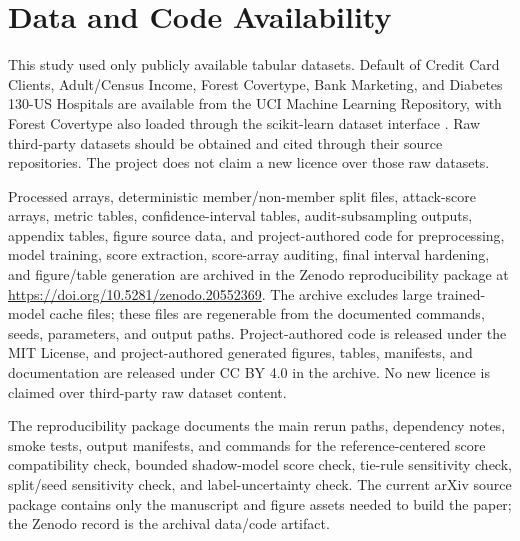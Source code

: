 \documentclass[
  10pt,
  twocolumn]{article}
\begin{document}
\hypertarget{data-and-code-availability}{%
\section{Data and Code Availability}\label{data-and-code-availability}}

This study used only publicly available tabular datasets. Default of Credit Card Clients, Adult/Census Income, Forest Covertype, Bank Marketing, and Diabetes 130-US Hospitals are available from the UCI Machine Learning Repository, with Forest Covertype also loaded through the scikit-learn dataset interface \cite{ref-25,ref-26,ref-27,ref-28,ref-29,ref-30}. Raw third-party datasets should be obtained and cited through their source repositories. The project does not claim a new licence over those raw datasets.

Processed arrays, deterministic member/non-member split files, attack-score arrays, metric tables, confidence-interval tables, audit-subsampling outputs, appendix tables, figure source data, and project-authored code for preprocessing, model training, score extraction, score-array auditing, final interval hardening, and figure/table generation are archived in the Zenodo reproducibility package at \url{https://doi.org/10.5281/zenodo.20552369}. The archive excludes large trained-model cache files; these files are regenerable from the documented commands, seeds, parameters, and output paths. Project-authored code is released under the MIT License, and project-authored generated figures, tables, manifests, and documentation are released under CC BY 4.0 in the archive. No new licence is claimed over third-party raw dataset content.

The reproducibility package documents the main rerun paths, dependency notes, smoke tests, output manifests, and commands for the reference-centered score compatibility check, bounded shadow-model score check, tie-rule sensitivity check, split/seed sensitivity check, and label-uncertainty check. The current arXiv source package contains only the manuscript and figure assets needed to build the paper; the Zenodo record is the archival data/code artifact.
\end{document}

